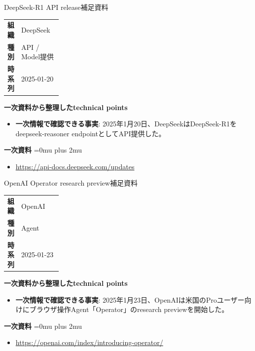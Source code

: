 \begin{technicalnote}{DeepSeek-R1 API release}{補足資料}
\begingroup
\begin{tabularx}{\linewidth}{@{}>{\bfseries}p{0.22\linewidth}X@{}}
組織 & DeepSeek \\
種別 & API / Model提供 \\
時系列 & 2025-01-20 \\
\end{tabularx}
\smallskip
{\bfseries 一次資料から整理したtechnical points}
\begin{itemize}[leftmargin=1.5em,itemsep=0.35em]
\item \textbf{一次情報で確認できる事実}: 2025年1月20日、DeepSeekはDeepSeek-R1をdeepseek-reasoner endpointとしてAPI提供した。
\end{itemize}
\begin{samepage}
{\bfseries 一次資料}
\begingroup\sloppy
\Urlmuskip=0mu plus 2mu\relax
\begin{itemize}[leftmargin=1.5em,itemsep=0.25em]
\item {\scriptsize\url{https://api-docs.deepseek.com/updates}}
\end{itemize}
\endgroup
\end{samepage}
\endgroup
\end{technicalnote}
\medskip

\begin{technicalnote}{OpenAI Operator research preview}{補足資料}
\begingroup
\begin{tabularx}{\linewidth}{@{}>{\bfseries}p{0.22\linewidth}X@{}}
組織 & OpenAI \\
種別 & Agent \\
時系列 & 2025-01-23 \\
\end{tabularx}
\smallskip
{\bfseries 一次資料から整理したtechnical points}
\begin{itemize}[leftmargin=1.5em,itemsep=0.35em]
\item \textbf{一次情報で確認できる事実}: 2025年1月23日、OpenAIは米国のProユーザー向けにブラウザ操作Agent「Operator」のresearch previewを開始した。
\end{itemize}
\begin{samepage}
{\bfseries 一次資料}
\begingroup\sloppy
\Urlmuskip=0mu plus 2mu\relax
\begin{itemize}[leftmargin=1.5em,itemsep=0.25em]
\item {\scriptsize\url{https://openai.com/index/introducing-operator/}}
\end{itemize}
\endgroup
\end{samepage}
\endgroup
\end{technicalnote}
\medskip

